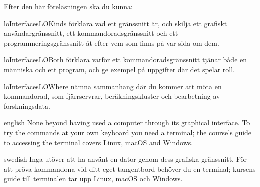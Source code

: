 \emph{} %
%
  {Efter den här föreläsningen ska du kunna:} %
\begin{restatable}{lo}{InterfacesLOKinds}\label{InterfacesLOKinds}%
    {förklara vad ett gränssnitt är, och skilja ett grafiskt
    användargränssnitt, ett kommandoradsgränssnitt och ett
    programmeringsgränssnitt åt efter vem som finns på var sida om dem.} %
\end{restatable}
\begin{restatable}{lo}{InterfacesLOBoth}\label{InterfacesLOBoth}%
    {förklara varför ett kommandoradsgränssnitt tjänar både en människa
    och ett program, och ge exempel på uppgifter där det spelar roll.} %
\end{restatable}
\begin{restatable}{lo}{InterfacesLOWhere}\label{InterfacesLOWhere}%
    {nämna sammanhang där du kommer att möta en kommandorad, som
    fjärrservrar, beräkningskluster och bearbetning av forskningsdata.} %
\end{restatable}

\emph{} %
\begin{onlyin}{english} %
None beyond having used a computer through its graphical interface.  To
try the commands at your own keyboard you need a terminal; the course's
guide to accessing the terminal covers Linux, macOS and Windows.
\end{onlyin}
\begin{onlyin}{swedish}
Inga utöver att ha använt en dator genom dess grafiska gränssnitt.  För
att pröva kommandona vid ditt eget tangentbord behöver du en terminal;
kursens guide till terminalen tar upp Linux, macOS och Windows.
\end{onlyin}
